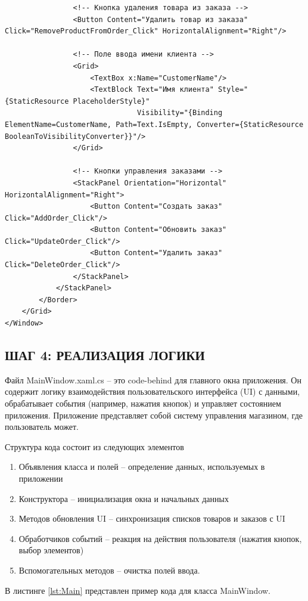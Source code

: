 \documentclass[12pt]{article}
\begin{document}
\begin{lstlisting}
                <!-- Кнопка удаления товара из заказа -->
                <Button Content="Удалить товар из заказа" Click="RemoveProductFromOrder_Click" HorizontalAlignment="Right"/>

                <!-- Поле ввода имени клиента -->
                <Grid>
                    <TextBox x:Name="CustomerName"/>
                    <TextBlock Text="Имя клиента" Style="{StaticResource PlaceholderStyle}"
                               Visibility="{Binding ElementName=CustomerName, Path=Text.IsEmpty, Converter={StaticResource BooleanToVisibilityConverter}}"/>
                </Grid>

                <!-- Кнопки управления заказами -->
                <StackPanel Orientation="Horizontal" HorizontalAlignment="Right">
                    <Button Content="Создать заказ" Click="AddOrder_Click"/>
                    <Button Content="Обновить заказ" Click="UpdateOrder_Click"/>
                    <Button Content="Удалить заказ" Click="DeleteOrder_Click"/>
                </StackPanel>
            </StackPanel>
        </Border>
    </Grid>
</Window>
\end{lstlisting}

\newpage

\subsection{ШАГ 4: РЕАЛИЗАЦИЯ ЛОГИКИ}

Файл MainWindow.xaml.cs -- это code-behind для главного окна приложения. Он содержит логику взаимодействия пользовательского интерфейса (UI) с данными, обрабатывает события (например, нажатия кнопок) и управляет состоянием приложения. Приложение представляет собой систему управления магазином, где пользователь может.

Структура кода состоит из следующих элементов
\begin{enumerate}
	\item Объявления класса и полей -- определение данных, используемых в приложении
	\item Конструктора -- инициализация окна и начальных данных
	\item Методов обновления UI -- синхронизация списков товаров и заказов с UI
	\item Обработчиков событий -- реакция на действия пользователя (нажатия кнопок, выбор элементов)
	\item Вспомогательных методов -- очистка полей ввода.
\end{enumerate}
В листинге \ref{lst:Main} представлен пример кода для класса MainWindow.
\end{document}
